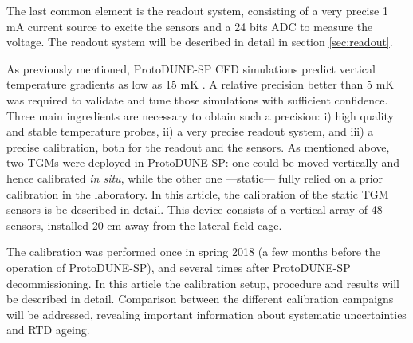 The last common element is the readout system, consisting of a very precise 1 mA current source to excite the sensors and a 24 bits ADC to measure the voltage. The readout system will be described in detail in section \ref{sec:readout}. 

As previously mentioned, ProtoDUNE-SP CFD simulations predict vertical temperature gradients as low as 15 mK \cite{pdsp_tdr}. A relative precision better than 5 mK was required to validate and tune those simulations with sufficient confidence. Three main ingredients are necessary to obtain such a precision: i) high quality and stable temperature probes, ii) a very precise readout system, and iii) a precise calibration, both for the readout and the sensors. As mentioned above, two TGMs were deployed in ProtoDUNE-SP: one could be moved vertically and hence calibrated \textit{in situ}, while the other one ---static--- fully relied on a prior calibration in the laboratory. In this article, the calibration of the static TGM \cite{tfm} sensors is be described in detail. This device consists of a vertical array of 48 sensors, installed 20 cm away from the lateral field cage. 

The calibration was performed once in spring 2018  (a few months before the operation of ProtoDUNE-SP), and several times after ProtoDUNE-SP decommissioning. In this article the calibration setup, procedure and results will be described in detail. Comparison between the different calibration campaigns will be addressed, revealing important information about systematic uncertainties and RTD ageing.